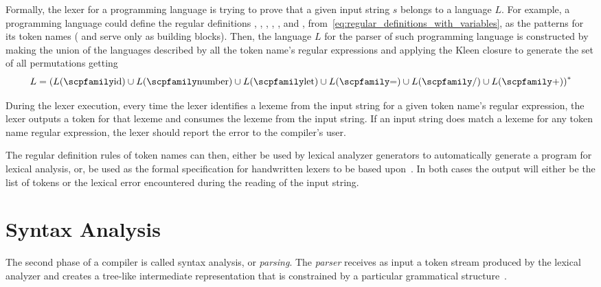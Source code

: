 \documentclass[
  oneside,
  english,
  coorientadorbanca,
  noabntexcite
]{ufsc-thesis-rn46-2019}
\newcommand{\code}[1]{\text{\scpfamily\setlength\spaceskip{0.35em}#1}}
\begin{document}
Formally, the lexer for a programming language is trying to prove that a given input string $s$ belongs to a language $L$.
For example, a programming language could define the regular definitions \code{id}, \code{number}, \code{let}, \code{=}, \code{/}, and \code{+}, from~\eqref{eq:regular_definitions_with_variables}, as the patterns for its token names (\code{digit} and \code{letter} serve only as building blocks).
Then, the language $L$ for the parser of such programming language is constructed by making the union of the languages described by all the token name's regular expressions and applying the Kleen closure to generate the set of all permutations getting
\begin{equation*}
  L = {(L(\code{id}) \cup L(\code{number}) \cup L(\code{let}) \cup L(\code{=}) \cup L(\code{/}) \cup L(\code{+}))}^*
\end{equation*}

During the lexer execution, every time the lexer identifies a lexeme from the input string for a given token name's regular expression, the lexer outputs a token for that lexeme and consumes the lexeme from the input string.
If an input string does match a lexeme for any token name regular expression, the lexer should report the error to the compiler's user.

The regular definition rules of token names can then, either be used by lexical analyzer generators to automatically generate a program for lexical analysis, or, be used as the formal specification for handwritten lexers to be based upon~\cite{Aho:2006:CPT:1177220}.
In both cases the output will either be the list of tokens or the lexical error encountered during the reading of the input string.

\section{Syntax Analysis}\label{chapter:background:sec:syntax}

The second phase of a compiler is called syntax analysis, or \textit{parsing}.
The \textit{parser} receives as input a token stream produced by the lexical analyzer and creates a tree-like intermediate representation that is constrained by a particular grammatical structure~\cite{Aho:2006:CPT:1177220}.
\end{document}
